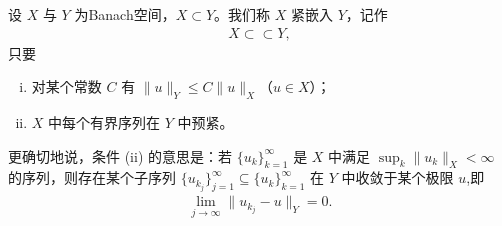 \documentclass[../../main.tex]{subfiles}
\begin{document}
\begin{definition}\label{definition:ch05-紧嵌入}
设 $X$ 与 $Y$ 为Banach空间，$X\subset Y$。我们称 $X$ 紧嵌入 $Y$，记作
\begin{align*}
X\subset \subset Y,
\end{align*}
只要
\begin{enumerate}[(i)]
\item 对某个常数 $C$ 有 $\|u\|_{Y}\leqslant C\|u\|_{X}$（$u\in X$）；
\item $X$ 中每个有界序列在 $Y$ 中预紧。
\end{enumerate}
更确切地说，条件 (ii) 的意思是：若 $\{u_{k}\}_{k=1}^{\infty}$ 是 $X$ 中满足 $\sup_{k}\|u_{k}\|_{X}<\infty$ 的序列，则存在某个子序列 $\{u_{k_{j}}\}_{j=1}^{\infty}\subseteq\{u_{k}\}_{k=1}^{\infty}$ 在 $Y$ 中收敛于某个极限 $u$,即
\begin{align*}
\lim_{j\to\infty}\|u_{k_{j}}-u\|_{Y}=0.
\end{align*}
\end{definition}
\end{document}
